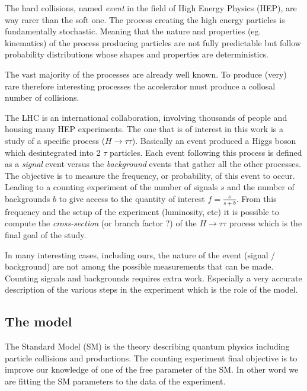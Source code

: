 The hard collisions, named \emph{event} in the field of High Energy Physics (HEP), are way rarer than the soft one.
The process creating the high energy particles is fundamentally stochastic.
Meaning that the nature and properties (eg. kinematics) of the process producing particles are not fully predictable but follow
probability distributions whose shapes and properties are deterministics.

The vast majority of the processes are already well known.
To produce (very) rare therefore interesting processes the accelerator must produce a collosal number of collisions.

The LHC is an international collaboration, involving thousands of people and housing many HEP experiments.
The one that is of interest in this work is a study of a specific process ($H \to \tau \tau$).
Basically an event produced a Higgs boson which desintegrated into 2 $\tau$ particles.
Each event following this process is defined as a \emph{signal} event versus the \emph{background} events that gather all the other processes.
The objective is to measure the frequency, or probability, of this event to occur.
Leading to a counting experiment of the number of signals $s$ and the number of backgrounds $b$ to give access to the quantity of interest $f = \frac{s}{s + b}$.
From this frequency and the setup of the experiment (luminosity, etc) it is possible to compute the \emph{cross-section} (or branch factor ?) of the $H \to \tau \tau$ process which is the final goal of the study.

In many interesting cases, including ours, the nature of the event (signal / background) are not among the possible measurements that can be made.
Counting signals and backgrounds requires extra work.
Especially a very accurate description of the various steps in the experiment which is the role of the model.






\subsection{The model} %
\label{sub:the_model}

The Standard Model \needcite (SM) is the theory describing quantum physics including particle collisions and productions.
The counting experiment final objective is to improve our knowledge of one of the free parameter of the SM.
In other word we are fitting the SM parameters to the data of the experiment.

